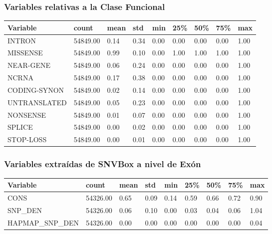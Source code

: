 \subsubsection{Variables relativas a la Clase Funcional}
\begin{table}[H]
\begin{tabular}{|l|l|l|l|l|l|l|l|l|}
\hline
Variable     & count    & mean & std  & min  & 25\% & 50\% & 75\% & max  \\ \hline
INTRON       & 54849.00 & 0.14 & 0.34 & 0.00 & 0.00 & 0.00 & 0.00 & 1.00 \\ \hline
MISSENSE     & 54849.00 & 0.99 & 0.10 & 0.00 & 1.00 & 1.00 & 1.00 & 1.00 \\ \hline
NEAR-GENE    & 54849.00 & 0.06 & 0.24 & 0.00 & 0.00 & 0.00 & 0.00 & 1.00 \\ \hline
NCRNA        & 54849.00 & 0.17 & 0.38 & 0.00 & 0.00 & 0.00 & 0.00 & 1.00 \\ \hline
CODING-SYNON & 54849.00 & 0.02 & 0.14 & 0.00 & 0.00 & 0.00 & 0.00 & 1.00 \\ \hline
UNTRANSLATED & 54849.00 & 0.05 & 0.23 & 0.00 & 0.00 & 0.00 & 0.00 & 1.00 \\ \hline
NONSENSE     & 54849.00 & 0.01 & 0.07 & 0.00 & 0.00 & 0.00 & 0.00 & 1.00 \\ \hline
SPLICE       & 54849.00 & 0.00 & 0.02 & 0.00 & 0.00 & 0.00 & 0.00 & 1.00 \\ \hline
STOP-LOSS    & 54849.00 & 0.00 & 0.01 & 0.00 & 0.00 & 0.00 & 0.00 & 1.00 \\ \hline
\end{tabular}
\end{table}

\subsubsection{Variables extraídas de SNVBox a nivel de Exón}
\begin{table}[H]
\begin{tabular}{|l|l|l|l|l|l|l|l|l|}
\hline
Variable         & count    & mean & std  & min  & 25\% & 50\% & 75\% & max  \\ \hline
CONS             & 54326.00 & 0.65 & 0.09 & 0.14 & 0.59 & 0.66 & 0.72 & 0.90 \\ \hline
SNP\_DEN         & 54326.00 & 0.06 & 0.10 & 0.00 & 0.03 & 0.04 & 0.06 & 1.04 \\ \hline
HAPMAP\_SNP\_DEN & 54326.00 & 0.00 & 0.00 & 0.00 & 0.00 & 0.00 & 0.00 & 0.04 \\ \hline
\end{tabular}
\end{table}





